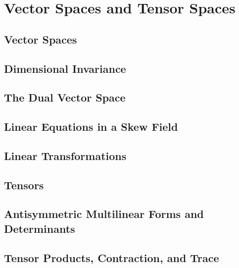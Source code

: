 \section{Vector Spaces and Tensor Spaces}

\subsection{Vector Spaces}

\subsection{Dimensional Invariance}

\subsection{The Dual Vector Space}

\subsection{Linear Equations in a Skew Field}

\subsection{Linear Transformations}

\subsection{Tensors}

\subsection{Antisymmetric Multilinear Forms and Determinants}

\subsection{Tensor Products, Contraction, and Trace}